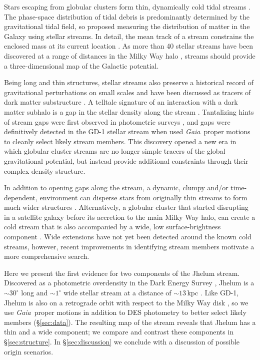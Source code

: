 \documentclass[twocolumn]{aastex62}
\newcommand{\gaia}{\textsl{Gaia}}
\begin{document}
Stars escaping from globular clusters form thin, dynamically cold tidal streams \citep[e.g.,][]{combes1999}.
The phase-space distribution of tidal debris is predominantly determined by the gravitational tidal field, so \citet{johnston1999} proposed measuring the distribution of matter in the Galaxy using stellar streams.
In detail, the mean track of a stream constrains the enclosed mass at its current location \citep{bh2018}.
As more than 40 stellar streams have been discovered at a range of distances in the Milky Way halo \citep[see][for a recent review]{gc2016}, streams should provide a three-dimensional map of the Galactic potential.

Being long and thin structures, stellar streams also preserve a historical record of gravitational perturbations on small scales and have been discussed as tracers of dark matter substructure \citep[e.g.,][]{johnston2002, carlberg2009}.
A telltale signature of an interaction with a dark matter subhalo is a gap in the stellar density along the stream \citep[e.g.,][]{ibata2002, yoon2011, eb2015}.
Tantalizing hints of stream gaps were first observed in photometric surveys \citep[e.g.,][]{carlberg2012,cg2013}, and gaps were definitively detected in the GD-1 stellar stream \citep{gd2006} when \citet{pwb} used \gaia\ proper motions to cleanly select likely stream members.
This discovery opened a new era in which globular cluster streams are no longer simple tracers of the global gravitational potential, but instead provide additional constraints  through their complex density structure.

In addition to opening gaps along the stream, a dynamic, clumpy and/or time-dependent, environment can disperse stars from originally thin streams to form much wider structures \citep[e.g.,][]{bonaca2014, ngan2016, pw2016, pearson2017}.
Alternatively, a globular cluster that started disrupting in a satellite galaxy before its accretion to the main Milky Way halo, can create a cold stream that is also accompanied by a wide, low surface-brightness component \citep{carlberg2018}.
Wide extensions have not yet been detected around the known cold streams, however, recent improvements in identifying stream members motivate a more comprehensive search.

Here we present the first evidence for two components of the Jhelum stream.
Discovered as a photometric overdensity in the Dark Energy Survey \citep[DES,][]{abbott2018}, Jhelum is a $\sim30^\circ$ long and $\sim1^\circ$ wide stellar stream at a distance of $\sim13\,$kpc \citep{shipp2018}.
Like GD-1, Jhelum is also on a retrograde orbit with respect to the Milky Way disk \citep{malhan2018}, so we use \gaia\ proper motions in addition to DES photometry to better select likely members (\S\ref{sec:data}).
The resulting map of the stream reveals that Jhelum has a thin and a wide component; we compare and contrast these components in \S\ref{sec:structure}.
In \S\ref{sec:discussion} we conclude with a discussion of possible origin scenarios.
\end{document}
